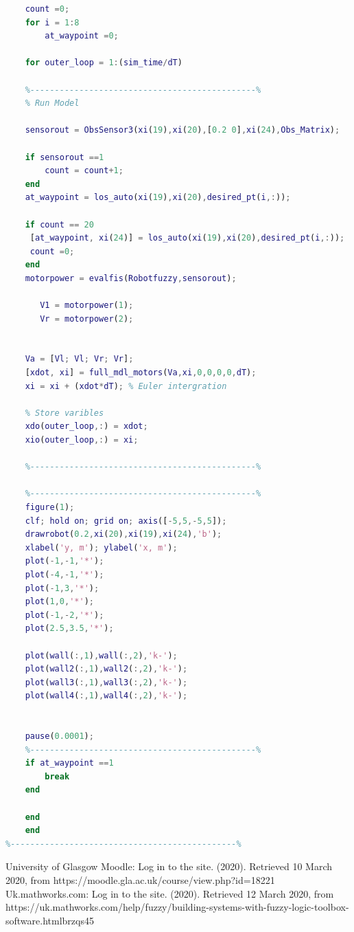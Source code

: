 \documentclass{l4proj}
\begin{document}
\begin{lstlisting}[language=Matlab, float, caption={Task 2, With a counter (Test 3-Final)}, label=lst:callahan]
%----------------------------------------------%
    count =0;
    for i = 1:8 
        at_waypoint =0;
    
    for outer_loop = 1:(sim_time/dT)

    %----------------------------------------------%
    % Run Model
   
    sensorout = ObsSensor3(xi(19),xi(20),[0.2 0],xi(24),Obs_Matrix);
    
    if sensorout ==1
        count = count+1;
    end
    at_waypoint = los_auto(xi(19),xi(20),desired_pt(i,:));
    
    if count == 20
     [at_waypoint, xi(24)] = los_auto(xi(19),xi(20),desired_pt(i,:));
     count =0;
    end
    motorpower = evalfis(Robotfuzzy,sensorout);
        
       V1 = motorpower(1);
       Vr = motorpower(2);
    

    Va = [Vl; Vl; Vr; Vr];
    [xdot, xi] = full_mdl_motors(Va,xi,0,0,0,0,dT);   
    xi = xi + (xdot*dT); % Euler intergration
    
    % Store varibles
    xdo(outer_loop,:) = xdot;
    xio(outer_loop,:) = xi;

    %----------------------------------------------%
    
    %----------------------------------------------%
    figure(1);
    clf; hold on; grid on; axis([-5,5,-5,5]);
    drawrobot(0.2,xi(20),xi(19),xi(24),'b');
    xlabel('y, m'); ylabel('x, m');
    plot(-1,-1,'*');
    plot(-4,-1,'*');
    plot(-1,3,'*');
    plot(1,0,'*');
    plot(-1,-2,'*');
    plot(2.5,3.5,'*');
    
    plot(wall(:,1),wall(:,2),'k-');
    plot(wall2(:,1),wall2(:,2),'k-');
    plot(wall3(:,1),wall3(:,2),'k-');
    plot(wall4(:,1),wall4(:,2),'k-');
  
    
    pause(0.0001);
    %----------------------------------------------%
    if at_waypoint ==1
        break
    end

    end
    end
%----------------------------------------------%
\end{lstlisting}







\renewcommand{\thechapter}{0} 
University of Glasgow Moodle: Log in to the site. (2020). Retrieved 10
March 2020, from https://moodle.gla.ac.uk/course/view.php?id=18221
\newline
Uk.mathworks.com: Log in to the site. (2020). Retrieved 12
March 2020, \newline from https://uk.mathworks.com/help/fuzzy/building-systems-with-fuzzy-logic-toolbox-software.htmlbrzqs45
\end{document}
